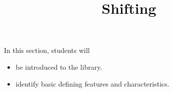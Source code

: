 \documentclass{ximera}
\title{Shifting}
\begin{document}
\begin{abstract}
\end{abstract}
\maketitle









\begin{sectionOutcomes}
In this section, students will 

\begin{itemize}
\item be introduced to the library.
\item identify basic defining features and characteristics.
\end{itemize}
\end{sectionOutcomes}
\end{document}
